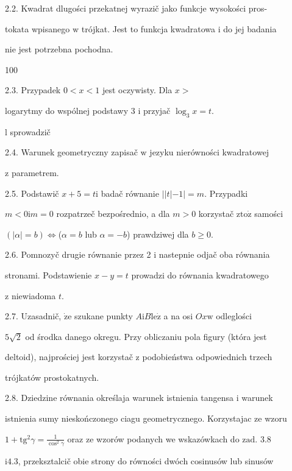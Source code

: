 \documentclass[a4paper,12pt]{article}
\begin{document}
2.2. Kwadrat dlugości przekatnej wyrazič jako funkcje wysokości pros-

tokata wpisanego $\mathrm{w}$ trójkat. Jest to funkcja kwadratowa $\mathrm{i}$ do jej badania

nie jest potrzebna pochodna.





100

2.3. Przypadek $0 < x < 1$ jest oczywisty. Dla $x >$

logarytmy do wspólnej podstawy 3 $\mathrm{i}$ przyjač $\log_{3}x=t.$

l sprowadzič

2.4. Warunek geometryczny zapisač $\mathrm{w}$ jezyku nierówności kwadratowej

$\mathrm{z}$ parametrem.

2.5. Podstawič $x+5 =t\mathrm{i}$ badač równanie $||t|-1| =m$. Przypadki

$m<0\mathrm{i}m=0$ rozpatrzeč bezpośrednio, a dla $m>0$ korzystač $\mathrm{z}\mathrm{t}\mathrm{o}\dot{\mathrm{z}}$ samości

$(|\alpha|=b)\Leftrightarrow$($\alpha=b$ lub $\alpha=-b$) prawdziwej dla $b\geq 0.$

2.6. Pomnozyč drugie równanie przez 2 $\mathrm{i}$ nastepnie odjač oba równania

stronami. Podstawienie $x-y = t$ prowadzi do równania kwadratowego

$\mathrm{z}$ niewiadoma $t.$

2.7. Uzasadnič, $\dot{\mathrm{z}}\mathrm{e}$ szukane punkty $A\mathrm{i}B\mathrm{l}\mathrm{e}\dot{\mathrm{z}}$ a na osi $Ox\mathrm{w}$ odleglości

$5\sqrt{2}$ od środka danego okregu. Przy obliczaniu pola figury (która jest

deltoid), najprościej jest korzystač $\mathrm{z}$ podobieństwa odpowiednich trzech

trójkatów prostokatnych.

2.8. Dziedzine równania określaja warunek istnienia tangensa $\mathrm{i}$ warunek

istnienia sumy nieskończonego ciagu geometrycznego. Korzystajac ze wzoru

$1+\mathrm{t}\mathrm{g}^{2}\gamma= \displaystyle \frac{1}{\cos^{2}\gamma}$ oraz ze wzorów podanych we wskazówkach do $\mathrm{z}\mathrm{a}\mathrm{d}$. 3.8

$\mathrm{i}4.3$, przeksztalcič obie strony do równości dwóch cosinusów lub sinusów
\end{document}
